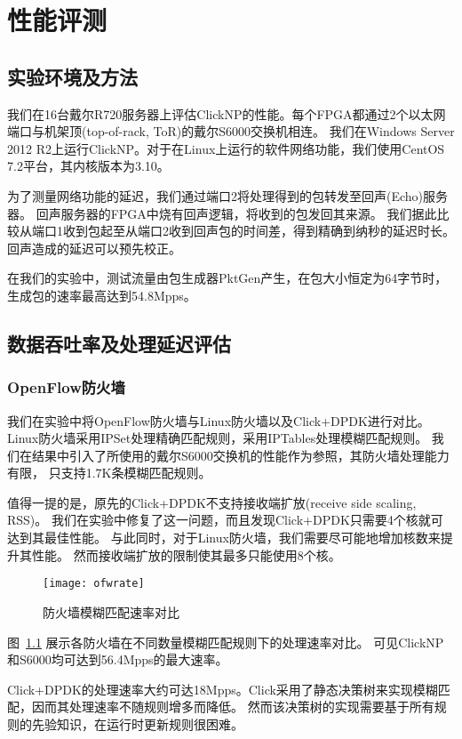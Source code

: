 \chapter{性能评测}
\section{实验环境及方法}
我们在16台戴尔R720服务器上评估ClickNP的性能。每个FPGA都通过2个以太网端口与机架顶(top-of-rack, ToR)的戴尔S6000交换机\cite{s6000}相连。
我们在Windows Server 2012 R2上运行ClickNP。对于在Linux上运行的软件网络功能，我们使用CentOS 7.2平台，其内核版本为3.10。

为了测量网络功能的延迟，我们通过端口2将处理得到的包转发至回声(Echo)服务器。
回声服务器的FPGA中烧有回声逻辑，将收到的包发回其来源。
我们据此比较从端口1收到包起至从端口2收到回声包的时间差，得到精确到纳秒的延迟时长。
回声造成的延迟可以预先校正。

在我们的实验中，测试流量由包生成器PktGen产生，在包大小恒定为64字节时，
生成包的速率最高达到54.8Mpps。

\section{数据吞吐率及处理延迟评估}
\subsection{OpenFlow防火墙}
我们在实验中将OpenFlow防火墙与Linux防火墙以及Click+DPDK\cite{Barbette:2015:FUP:2772722.2772727}进行对比。
Linux防火墙采用IPSet处理精确匹配规则，采用IPTables处理模糊匹配规则。
我们在结果中引入了所使用的戴尔S6000交换机的性能作为参照，其防火墙处理能力有限，
只支持1.7K条模糊匹配规则。

值得一提的是，原先的Click+DPDK不支持接收端扩放(receive side scaling, RSS)。
我们在实验中修复了这一问题，而且发现Click+DPDK\cite{Barbette:2015:FUP:2772722.2772727}只需要4个核就可达到其最佳性能。
与此同时，对于Linux防火墙，我们需要尽可能地增加核数来提升其性能。
然而接收端扩放的限制使其最多只能使用8个核。

\begin{figure}[htbp]
\centering
\texttt{[image: ofwrate]}
\caption{防火墙模糊匹配速率对比} \label{fig:ofwrate}
\end{figure}
图~\ref{fig:ofwrate} 展示各防火墙在不同数量模糊匹配规则下的处理速率对比。
可见ClickNP和S6000均可达到56.4Mpps的最大速率。

Click+DPDK的处理速率大约可达18Mpps。Click采用了静态决策树来实现模糊匹配，因而其处理速率不随规则增多而降低。
然而该决策树的实现需要基于所有规则的先验知识，在运行时更新规则很困难。

